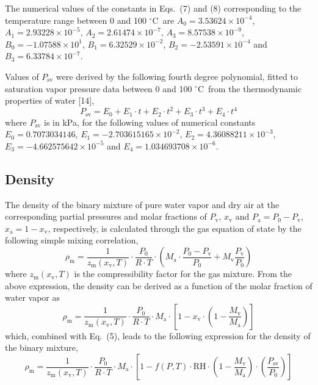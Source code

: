 \documentclass[11pt]{article}
\newcommand{\degC}{$^{\circ}$C}
\newcommand{\Psv}{P_\mathrm{sv}}
\newcommand{\RH}{\mathrm{RH}}
\newcommand{\fPT}{f(P,T)}
\begin{document}
\noindent The numerical values of the constants in Eqs.~(7) and (8)
corresponding to the temperature range between 0 and 100 \degC\ are
$A_0 = 3.53624\times10^{-4}$,
$A_1 = 2.93228\times10^{-5}$,
$A_2 = 2.61474\times10^{-7}$,
$A_3 = 8.57538\times10^{-9}$,
$B_0 = -1.07588\times10^{1}$,
$B_1 = 6.32529\times10^{-2}$,
$B_2 = -2.53591\times10^{-4}$ and
$B_3 = 6.33784\times10^{-7}$.


\noindent Values of $\Psv$ were derived by the following fourth degree
polynomial, fitted to saturation vapor pressure data between 0 and
100 \degC\ from the thermodynamic properties of water [14],
\begin{equation}
\Psv = E_0 + E_1\cdot t + E_2\cdot t^{2} + E_3\cdot t^{3}
       + E_4\cdot t^{4}
\end{equation}
where $\Psv$ is in kPa, for the following values of numerical
constants
\linebreak
$E_0 = 0.7073034146$,
$E_1 = -2.703615165\times10^{-2}$,
$E_2 = 4.36088211\times10^{-3}$,
$E_3 = -4.662575642\times10^{-5}$ and
$E_4 = 1.034693708\times10^{-6}$.\hfill\null

\subsection{Density}

\noindent The density of the binary mixture of pure water vapor and dry
air at the corresponding partial pressures and molar fractions of
$P_\mathrm{v}$, $x_\mathrm{v}$ and
$P_\mathrm{a} = P_0 - P_\mathrm{v}$,
$x_\mathrm{a} = 1 - x_\mathrm{v}$, respectively, is calculated through
the gas equation of state by the following simple mixing correlation,
\begin{equation}
\rho_\mathrm{m} = \frac{1}{z_\mathrm{m}(x_\mathrm{v},T)}
  \cdot\frac{P_0}{R\cdot T}
  \cdot\left( M_\mathrm{a}\cdot\frac{P_0-P_\mathrm{v}}{P_0}
            + M_\mathrm{v}\frac{P_\mathrm{v}}{P_0} \right)
\end{equation}
where $z_\mathrm{m}(x_\mathrm{v},T)$ is the compressibility factor for
the gas mixture. From the above expression, the density can be derived
as a function of the molar fraction of water vapor as
\begin{equation}
\rho_\mathrm{m} = \frac{1}{z_\mathrm{m}(x_\mathrm{v},T)}
  \cdot\frac{P_0}{R\cdot T}\cdot M_\mathrm{a}
  \cdot\left[1 - x_\mathrm{v}\cdot
    \left(1-\frac{M_\mathrm{v}}{M_\mathrm{a}}\right)\right]
\end{equation}
which, combined with Eq.~(5), leads to the following expression for the
density of the binary mixture,
\begin{equation}
\rho_\mathrm{m} = \frac{1}{z_\mathrm{m}(x_\mathrm{v},T)}
  \cdot\frac{P_0}{R\cdot T}\cdot M_\mathrm{a}
  \cdot\left[1 - \fPT\cdot\RH\cdot
    \left(1-\frac{M_\mathrm{v}}{M_\mathrm{a}}\right)
    \cdot\left(\frac{\Psv}{P_0}\right)\right]
\end{equation}
\end{document}

